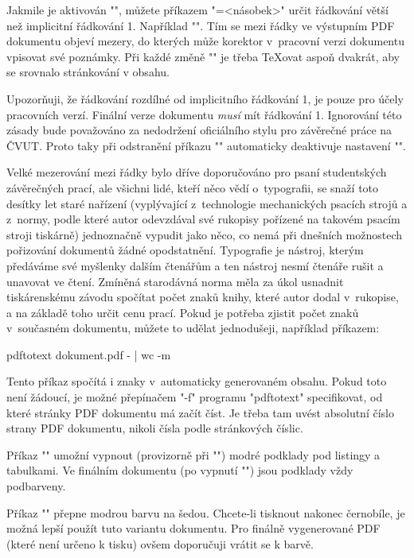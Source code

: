 Jakmile je aktivován "\draft", můžete příkazem "\linespacing=<násobek>"
určit řádkování větší než implicitní řádkování 1. Například
"". Tím se mezi řádky ve výstupním PDF dokumentu 
objeví mezery, do kterých může korektor v~pracovní verzi dokumentu 
vpisovat své poznámky. Při každé změně "\linespacing" je třeba \TeX{}ovat
aspoň dvakrát, aby se srovnalo stránkování v obsahu.

Upozorňuji, že řádkování rozdílné od implicitního řádkování 1, je pouze pro
účely pracovních verzí. Finální verze dokumentu {\em musí} mít řádkování 1. 
Ignorování této zásady bude považováno za nedodržení oficiálního
stylu pro závěrečné práce na ČVUT. Proto taky \ctustyle{} při odstranění příkazu
"\draft" automaticky deaktivuje nastavení "\linespacing".

Velké mezerování mezi řádky bylo dříve
doporučováno pro psaní studentských závěrečných prací, ale všichni lidé, kteří
něco vědí o~typografii, se snaží toto desítky let staré nařízení (vyplývající
z~technologie mechanických psacích strojů a z~normy, podle které autor
odevzdával své rukopisy pořízené na takovém psacím stroji tiskárně) jednoznačně vypudit
jako něco, co nemá při dnešních možnostech pořizování dokumentů žádné
opodstatnění. Typografie je nástroj, kterým předáváme své myšlenky dalším
čtenářům a ten nástroj nesmí čtenáře rušit a unavovat ve čtení.
%
Zmíněná starodávná norma měla za úkol usnadnit tiskárenskému závodu
spočítat počet znaků knihy, které autor dodal v~rukopise, a na základě toho
určit cenu prací. Pokud je potřeba zjistit počet znaků v~současném dokumentu, 
můžete to udělat jednodušeji, například příkazem:

\begtt
pdftotext dokument.pdf - | wc -m
\endtt

Tento příkaz spočítá i znaky v~automaticky generovaném obsahu. Pokud toto
není žádoucí, je možné přepínačem "-f" programu "pdftotext" specifikovat, od
které stránky PDF dokumentu má začít číst. Je třeba tam uvést absolutní číslo
strany PDF dokumentu, nikoli čísla podle stránkových číslic.

Příkaz "\savetoner" umožní vypnout (provizorně při "\draft") modré podklady
pod listingy a tabulkami. Ve finálním dokumentu (po vypnutí "\draft") 
jsou podklady vždy podbarveny.

Příkaz "\blackwhite" přepne modrou barvu na šedou. Chcete-li tisknout
nakonec černobíle, je možná lepší použít tuto variantu dokumentu. Pro
finálně vygenerované PDF (které není určeno k tisku) ovšem doporučuji 
vrátit se k barvě.

